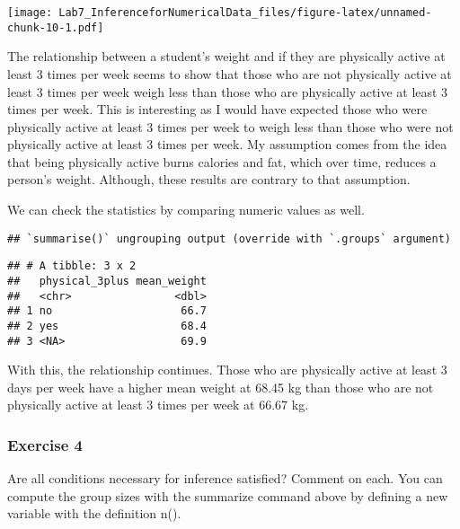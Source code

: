 \documentclass[
]{article}
\newenvironment{Shaded}{\begin{snugshade}}{\end{snugshade}}
\newcommand{\DataTypeTok}[1]{\textcolor[rgb]{0.13,0.29,0.53}{#1}}
\newcommand{\KeywordTok}[1]{\textcolor[rgb]{0.13,0.29,0.53}{\textbf{#1}}}
\newcommand{\NormalTok}[1]{#1}
\newcommand{\OperatorTok}[1]{\textcolor[rgb]{0.81,0.36,0.00}{\textbf{#1}}}
\newcommand{\OtherTok}[1]{\textcolor[rgb]{0.56,0.35,0.01}{#1}}
\newcommand{\StringTok}[1]{\textcolor[rgb]{0.31,0.60,0.02}{#1}}
\begin{document}
\texttt{[image: Lab7\_InferenceforNumericalData\_files/figure-latex/unnamed-chunk-10-1.pdf]}

The relationship between a student's weight and if they are physically
active at least 3 times per week seems to show that those who are not
physically active at least 3 times per week weigh less than those who
are physically active at least 3 times per week. This is interesting as
I would have expected those who were physically active at least 3 times
per week to weigh less than those who were not physically active at
least 3 times per week. My assumption comes from the idea that being
physically active burns calories and fat, which over time, reduces a
person's weight. Although, these results are contrary to that
assumption.

We can check the statistics by comparing numeric values as well.

\begin{Shaded}
\end{Shaded}

\begin{verbatim}
## `summarise()` ungrouping output (override with `.groups` argument)
\end{verbatim}

\begin{verbatim}
## # A tibble: 3 x 2
##   physical_3plus mean_weight
##   <chr>                <dbl>
## 1 no                    66.7
## 2 yes                   68.4
## 3 <NA>                  69.9
\end{verbatim}

With this, the relationship continues. Those who are physically active
at least 3 days per week have a higher mean weight at 68.45 kg than
those who are not physically active at least 3 times per week at 66.67
kg.

\hypertarget{exercise-4}{%
\subsubsection{Exercise 4}\label{exercise-4}}

Are all conditions necessary for inference satisfied? Comment on each.
You can compute the group sizes with the summarize command above by
defining a new variable with the definition n().
\end{document}
